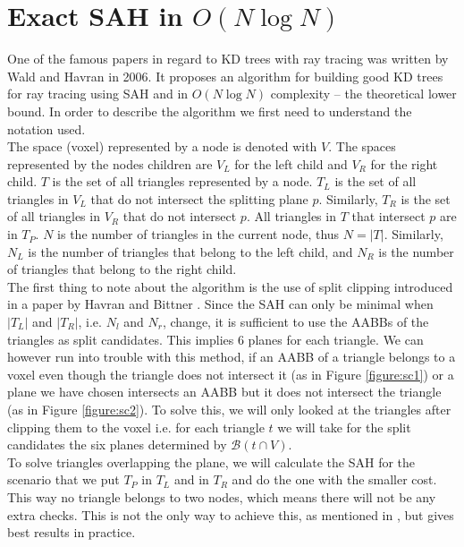 \documentclass[12pt]{article}
\begin{document}
\section{Exact SAH in $O(N\log N)$}
One of the famous papers in regard to KD trees with ray tracing was written by Wald and Havran \cite{wald2006building} in 2006. It proposes an algorithm for building good KD trees for ray tracing using SAH and in $O(N\log N)$ complexity -- the theoretical lower bound. In order to describe the algorithm we first need to understand the notation used.\\
\indent The space (voxel) represented by a node is denoted with $V$. The spaces represented by the nodes children are $V_L$ for the left child and $V_R$ for the right child. $T$ is the set of all triangles represented by a node. $T_L$ is the set of all triangles in $V_L$ that do not intersect the splitting plane $p$. Similarly, $T_R$ is the set of all triangles in $V_R$ that do not intersect $p$. All triangles in $T$ that intersect $p$ are in $T_P$. $N$ is the number of triangles in the current node, thus $N=|T|$. Similarly, $N_L$ is the number of triangles that belong to the left child, and $N_R$ is the number of triangles that belong to the right child.\\
\indent The first thing to note about the algorithm is the use of split clipping introduced in a paper by Havran and Bittner \cite{havran2002improving}. Since the SAH can only be minimal when $|T_L|$ and $|T_R|$, i.e. $N_l$ and $N_r$, change, it is sufficient to use the AABBs of the triangles as split candidates. This implies 6 planes for each triangle. We can however run into trouble with this method, if an AABB of a triangle belongs to a voxel even though the triangle does not intersect it (as in Figure \ref{figure:sc1}) or a plane we have chosen intersects an AABB but it does not intersect the triangle (as in Figure \ref{figure:sc2}). To solve this, we will only looked at the triangles after clipping them to the voxel i.e. for each triangle $t$ we will take for the split candidates the six planes determined by $\mathcal{B}(t\cap V)$.\\
\indent To solve triangles overlapping the plane, we will calculate the SAH for the scenario that we put $T_P$ in $T_L$ and in $T_R$ and do the one with the smaller cost. This way no triangle belongs to two nodes, which means there will not be any extra checks. This is not the only way to achieve this, as mentioned in \cite{havran2002improving}, but gives best results in practice.
\end{document}
